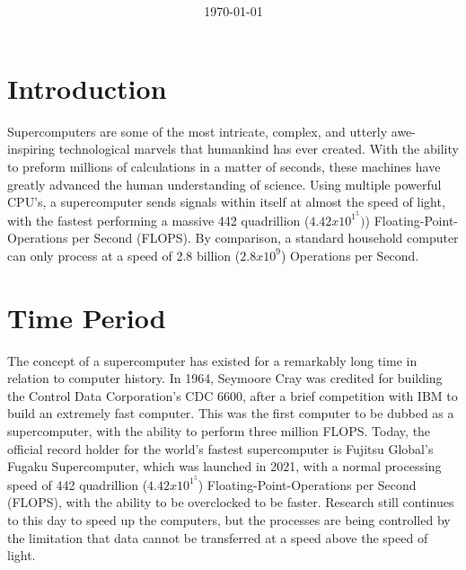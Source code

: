\documentclass[11pt, twocolumn]{article}
\title{{\large } \thetitle}
\author{\theauthor}
\date{\today}
\begin{document}
\maketitle

\thispagestyle{firstpage}

\section{Introduction}
Supercomputers are some of the most intricate, complex, and utterly awe-inspiring technological marvels that humankind has ever created. With the ability to preform millions of calculations in a matter of seconds, these machines have greatly advanced the human understanding of science. Using multiple powerful CPU's, a supercomputer sends signals within itself at almost the speed of light, with the fastest performing a massive 442 quadrillion (\begin{math}4.42x10^1^5)\end{math}) Floating-Point-Operations per Second (FLOPS). By comparison, a standard household computer can only process at a speed of 2.8 billion (\begin{math}2.8x10^9\end{math}) Operations per Second.

\section{Time Period}
The concept of a supercomputer has existed for a remarkably long time in relation to computer history. In 1964, Seymoore Cray was credited for building the Control Data Corporation's CDC 6600, after a brief competition with IBM to build an extremely fast computer. This was the first computer to be dubbed as a supercomputer, with the ability to perform three million FLOPS. Today, the official record holder for the world's fastest supercomputer is Fujitsu Global's Fugaku Supercomputer, which was launched in 2021, with a normal processing speed of 442 quadrillion (\begin{math}4.42x10^1^5\end{math}) Floating-Point-Operations per Second (FLOPS), with the ability to be overclocked to be faster. Research still continues to this day to speed up the computers, but the processes are being controlled by the limitation that data cannot be transferred at a speed above the speed of light.
\end{document}
